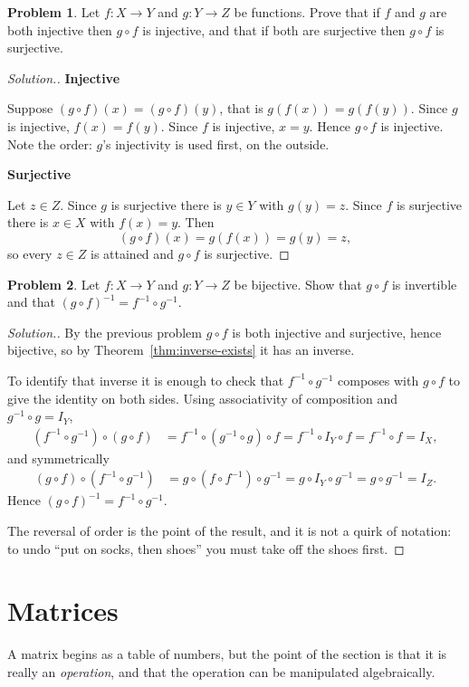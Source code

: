 \documentclass[11pt,a4paper]{article}
\theoremstyle{definition}
\newtheorem{problemx}{Problem}[section]
\newenvironment{problem}{\begin{problemx}}{\end{problemx}}
\newenvironment{solution}
  {\renewcommand{\qedsymbol}{}\begin{proof}[\textit{Solution}.]}
  {\end{proof}}
\newcommand{\subhead}[1]{%
  \par\medskip\noindent\textbf{#1}\par\nobreak\smallskip}
\begin{document}
\begin{problem}
Let $f:X\rightarrow Y$ and $g:Y\rightarrow Z$ be functions. Prove that if $f$
and $g$ are both injective then $g\circ f$ is injective, and that if both are
surjective then $g\circ f$ is surjective.
\end{problem}
\begin{solution}
\subhead{Injective}
Suppose $(g\circ f)(x)=(g\circ f)(y)$, that is $g(f(x))=g(f(y))$. Since $g$ is
injective, $f(x)=f(y)$. Since $f$ is injective, $x=y$. Hence $g\circ f$ is
injective. Note the order: $g$'s injectivity is used first, on the outside.

\subhead{Surjective}
Let $z\in Z$. Since $g$ is surjective there is $y\in Y$ with $g(y)=z$. Since
$f$ is surjective there is $x\in X$ with $f(x)=y$. Then
$$(g\circ f)(x)=g(f(x))=g(y)=z,$$
so every $z\in Z$ is attained and $g\circ f$ is surjective.
\end{solution}

\begin{problem}
Let $f:X\rightarrow Y$ and $g:Y\rightarrow Z$ be bijective. Show that
$g\circ f$ is invertible and that $(g\circ f)^{-1}=f^{-1}\circ g^{-1}$.
\end{problem}
\begin{solution}
By the previous problem $g\circ f$ is both injective and surjective, hence
bijective, so by Theorem~\ref{thm:inverse-exists} it has an inverse.

To identify that inverse it is enough to check that $f^{-1}\circ g^{-1}$
composes with $g\circ f$ to give the identity on both sides. Using
associativity of composition and $g^{-1}\circ g=I_Y$,
\begin{align*}
(f^{-1}\circ g^{-1})\circ(g\circ f)
 &=f^{-1}\circ (g^{-1}\circ g)\circ f
 =f^{-1}\circ I_Y\circ f
 =f^{-1}\circ f=I_X,
\end{align*}
and symmetrically
\begin{align*}
(g\circ f)\circ (f^{-1}\circ g^{-1})
 &=g\circ (f\circ f^{-1})\circ g^{-1}
 =g\circ I_Y\circ g^{-1}
 =g\circ g^{-1}=I_Z.
\end{align*}
Hence $(g\circ f)^{-1}=f^{-1}\circ g^{-1}$.

The reversal of order is the point of the result, and it is not a quirk of
notation: to undo ``put on socks, then shoes'' you must take off the shoes
first.
\end{solution}

\pagebreak
\section{Matrices}
A matrix begins as a table of numbers, but the point of the section is that it
is really an \emph{operation}, and that the operation can be manipulated
algebraically.
\end{document}
